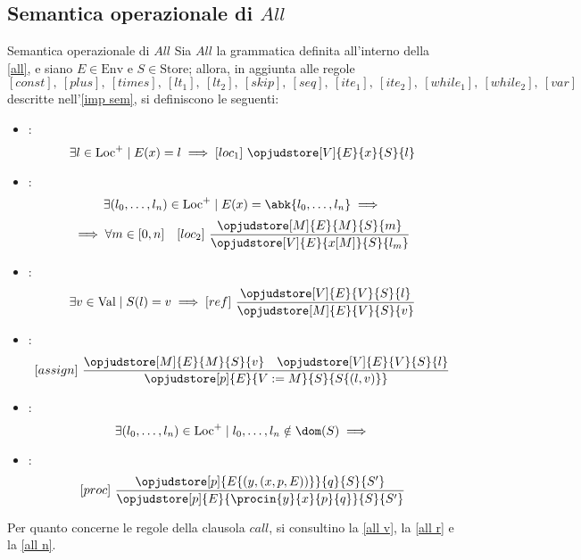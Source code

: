 \documentclass[a4paper, 12pt]{report}
\begin{document}
    \subsection{Semantica operazionale di $All$}

    \begin{framedprop}[label={all sem}, breakable]{Semantica operazionale di $All$}
        Sia $All$ la grammatica definita all'interno della \cref{all}, e siano $E \in \mathrm{Env}$ e $S \in \mathrm{Store}$; allora, in aggiunta alle regole $$[const], \ [plus], \ [times], \ [lt_1], \ [lt_2], \ [skip], \ [seq], \ [ite_1], \ [ite_2], \ [while_1], \ [while_2], \ [var]$$ descritte nell'\cref{imp sem}, si definiscono le seguenti:

        \begin{itemize}
            \item {}: $$\exists l \in \mathrm{Loc}^+ \mid E(x) = l \implies [loc_1] \ \opjudstore[V]{E}{x}{S}{l}$$
            \item {}: $$\exists (l_0, \ldots, l_n) \in \mathrm{Loc}^+ \mid E(x) = \abk{l_0, \ldots, l_n} \implies$$ $$\implies \forall m \in [0, n] \quad [loc_2] \ \dfrac{\opjudstore[M]{E}{M}{S}{m}}{\opjudstore[V]{E}{x[M]}{S}{l_m}}$$
            \item {}: $$\exists v \in \mathrm{Val} \mid S(l) = v \implies [ref] \ \dfrac{\opjudstore[V]{E}{V}{S}{l}}{\opjudstore[M]{E}{V}{S}{v}}$$
            \item {}: $$[assign] \ \dfrac{\opjudstore[M]{E}{M}{S}{v} \quad \opjudstore[V]{E}{V}{S}{l}}{\opjudstore[p]{E}{V := M}{S}{S\{(l,v)\}}}$$
            \item {}: $$\exists (l_0, \ldots, l_n) \in \mathrm{Loc}^+ \mid l_0, \ldots, l_n \notin \dom(S) \implies$$ 
            \item {}: $$[proc] \ \dfrac{\opjudstore[p]{E\{(y,(x,p, E))\}}{q}{S}{S'}}{\opjudstore[p]{E}{\procin{y}{x}{p}{q}}{S}{S'}}$$
        \end{itemize}

        Per quanto concerne le regole della clausola $call$, si consultino la \cref{all v}, la \cref{all r} e la \cref{all n}.
    \end{framedprop}
\end{document}
